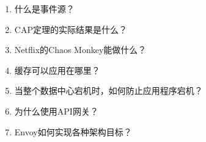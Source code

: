 \begin{enumerate}
\item
什么是事件源？

\item 
CAP定理的实际结果是什么？

\item 
Netflix的Chaos Monkey能做什么？

\item 
缓存可以应用在哪里？

\item 
当整个数据中心宕机时，如何防止应用程序宕机？

\item 
为什么使用API网关？

\item 
Envoy如何实现各种架构目标？
\end{enumerate}